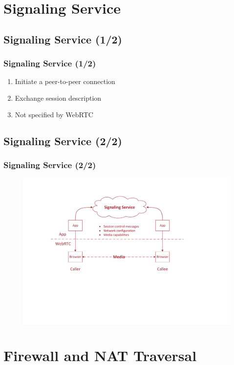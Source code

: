 \documentclass{beamer}
\begin{document}
\section{Signaling Service}
\subsection{Signaling Service (1/2)}
\begin{frame}
	\frametitle{Signaling Service (1/2)}
	\begin{enumerate}
		\item Initiate a peer-to-peer connection
		\item Exchange session description
		\item Not specified by WebRTC
	\end{enumerate}
\end{frame}

\subsection{Signaling Service (2/2)}
\begin{frame}
	\frametitle{Signaling Service (2/2)}
	\begin{figure}[h!]
		\centering
		\includegraphics[scale=0.6]{figs/signal.pdf}
	\end{figure}
\end{frame}

\section{Firewall and NAT Traversal}
\end{document}
